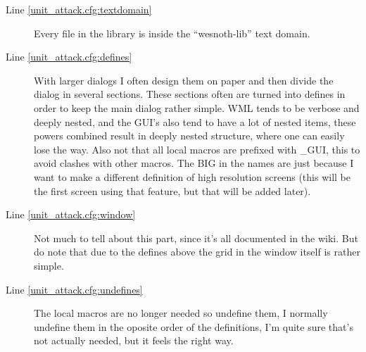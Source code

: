 \begin{description}
	\begin{description}
	\item[Line \ref{unit_attack.cfg:textdomain}]
		Every file in the library is inside the ``wesnoth-lib'' text domain.

	\item[Line \ref{unit_attack.cfg:defines}]
		With larger dialogs I often design them on paper and then divide the
dialog in several sections. These sections often are turned into defines in
order to keep the main dialog rather simple. WML tends to be verbose and deeply
nested, and the GUI's also tend to have a lot of nested items, these powers
combined result in deeply nested structure, where one can easily lose the way.
Also not that all local macros are prefixed with \_GUI, this to avoid clashes
with other macros. The BIG in the names are just because I want to make a
different definition of high resolution screens (this will be the first screen
using that feature, but that will be added later).

	\item[Line \ref{unit_attack.cfg:window}]
		Not much to tell about this part, since it's all documented in the wiki.
But do note that due to the defines above the grid in the window itself is
rather simple.

	\item[Line \ref{unit_attack.cfg:undefines}]
		The local macros are no longer needed so undefine them, I normally
undefine them in the oposite order of the definitions, I'm quite sure that's not
actually needed, but it feels the right way\texttrademark.

	\end{description}

\end{description}

